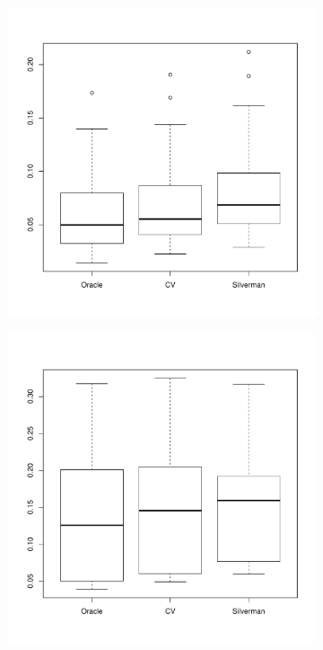 \begin{figure}[htbp]
    \centering
    \begin{subfigure}[t]{0.45\textwidth}
        \includegraphics[width=\textwidth]{results/by_overall/relative-peak-drift-boxplot}
        \label{fig:discussion:overall_peakdrift_boxplot:unif}
    \end{subfigure}
    \begin{subfigure}[t]{0.45\textwidth}
        \includegraphics[width=\textwidth]{results/by_overall/relative-peak-drift-peakpop-boxplot}

\end{subfigure}
\end{figure}
